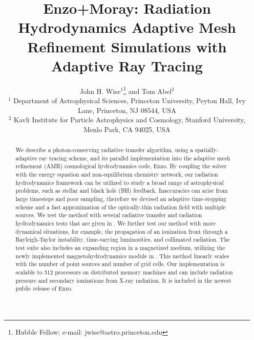 \documentclass[useAMS,usenatbib]{mn2e}
\begin{document}
\title[AMR Simulations with Adaptive Ray Tracing] {Enzo+Moray:
  Radiation Hydrodynamics Adaptive Mesh Refinement Simulations with
  Adaptive Ray Tracing}

\author[J. H. Wise and T. Abel] {John H. Wise$^1$\thanks{Hubble
    Fellow; e-mail: jwise@astro.princeton.edu} and Tom Abel$^2$\\
$^{1}$ Department of Astrophysical Sciences, Princeton University,
Peyton Hall, Ivy Lane, Princeton, NJ 08544, USA\\
$^{2}$ Kavli Institute for Particle Astrophysics and Cosmology,
Stanford University, Menlo Park, CA 94025, USA}

\pagerange{\pageref{firstpage}--\pageref{lastpage}} 

\maketitle
\label{firstpage}

\begin{abstract}

  We describe a photon-conserving radiative transfer algorithm, using
  a spatially-adaptive ray tracing scheme, and its parallel
  implementation into the adaptive mesh refinement (AMR) cosmological
  hydrodynamics code, Enzo.  By coupling the solver with the energy
  equation and non-equilibrium chemistry network, our radiation
  hydrodynamics framework can be utilized to study a broad range of
  astrophysical problems, such as stellar and black hole (BH)
  feedback.  Inaccuracies can arise from large timesteps and poor
  sampling, therefore we devised an adaptive time-stepping scheme and
  a fast approximation of the optically-thin radiation field with
  multiple sources.  We test the method with several radiative
  transfer and radiation hydrodynamics tests that are given in
  \citet{RT06, Iliev09}.  We further test our method with more
  dynamical situations, for example, the propagation of an ionization
  front through a Rayleigh-Taylor instability, time-varying
  luminosities, and collimated radiation.  The test suite also
  includes an expanding \hii region in a magnetized medium, utilizing
  the newly implemented magnetohydrodynamics module in \enzo.  This
  method linearly scales with the number of point sources and number
  of grid cells.  Our implementation is scalable to 512 processors on
  distributed memory machines and can include radiation pressure and
  secondary ionizations from X-ray radiation.  It is included in the
  newest public release of Enzo.
  
\end{abstract}
\end{document}
